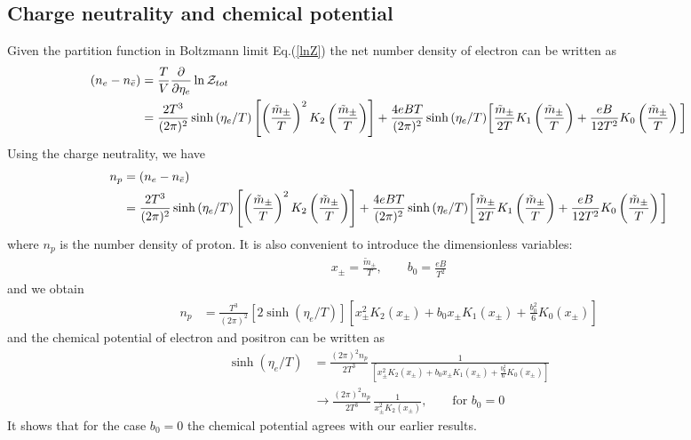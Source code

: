 \documentclass[Universe,article,submit,moreauthors,pdftex]{Definitions/mdpi}
\begin{document}
\subsection{Charge neutrality and chemical potential}
Given the partition function in Boltzmann limit Eq.(\ref{lnZ}) the net number density of electron can be written as
\begin{align}
\left(n_e-n_{\bar e}\right)&=\frac{T}{V}\frac{\partial}{\partial \eta_{e}}\ln\mathcal{Z}_{tot}\notag\\
&=\frac{2T^3}{(2\pi)^2}\sinh{(\eta_{e}/T)}\left[\left(\frac{\tilde{m}_\pm}{T}\right)^2K_2\left(\frac{\tilde{m}_{\pm}}{T}\right)\right]+\frac{4eBT}{(2\pi)^2}\sinh{(\eta_{e}/T)}\bigg[\frac{\tilde{m}_\pm}{2T}K_1\left(\frac{\tilde{m}_{\pm}}{T}\right)+\frac{eB}{12T^2}K_0\left(\frac{\tilde{m}_{\pm}}{T}\right)\bigg]
\end{align}
Using the charge neutrality, we have
\begin{align}
n_p&=\left(n_e-n_{\bar e}\right)\notag\\
&=\frac{2T^3}{(2\pi)^2}\sinh{(\eta_{e}/T)}\left[\left(\frac{\tilde{m}_\pm}{T}\right)^2K_2\left(\frac{\tilde{m}_{\pm}}{T}\right)\right]
+\frac{4eBT}{(2\pi)^2}\sinh{(\eta_{e}/T)}\bigg[\frac{\tilde{m}_\pm}{2T}K_1\left(\frac{\tilde{m}_{\pm}}{T}\right)+\frac{eB}{12T^2}K_0\left(\frac{\tilde{m}_{\pm}}{T}\right)\bigg]
\end{align}
where $n_p$ is the number density of proton. It is also convenient to introduce the dimensionless variables:
\begin{align}
x_\pm=\frac{\tilde m_\pm}{T},\qquad b_0=\frac{eB}{T^2}
\end{align}
and we obtain
\begin{align}
n_p&=\frac{T^3}{(2\pi)^2}\left[2\sinh{(\eta_{e}/T)}\right]\left[x_\pm^2K_2(x_\pm)+b_0x_\pm K_1(x_\pm)+\frac{b^2_0}{6}K_0(x_\pm)\right]
\end{align}
and the chemical potential of electron and positron can be written as
\begin{align}\label{ChemicalPotential}
\sinh{(\eta_{e}/T)}&=\frac{(2\pi)^2n_p}{2T^3}\,\frac{1}{\left[x_\pm^2K_2(x_\pm)+b_0x_\pm K_1(x_\pm)+\frac{b^2_0}{6}K_0(x_\pm)\right]}\\
&\longrightarrow\frac{(2\pi)^2n_p}{2T^3}\,\frac{1}{x_\pm^2K_2(x_\pm)},\qquad \mathrm{for}\,\,b_0=0
\end{align}
It shows that for the case $b_0=0$ the chemical potential agrees with our earlier results.
\end{document}

